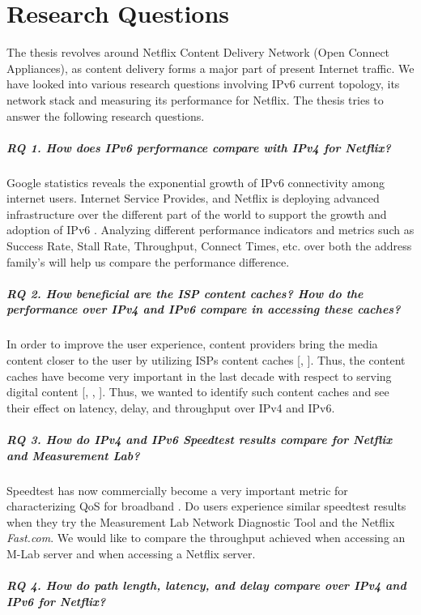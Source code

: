 \FloatBarrier

\section{Research Questions}
The thesis revolves around Netflix Content Delivery Network (Open Connect Appliances), as content delivery forms a major part of present Internet traffic. 
We have looked into various research questions involving IPv6 current topology, its network stack and measuring its performance for Netflix. 
The thesis tries to answer the following research questions.

\subparagraph{RQ 1. How does IPv6 performance compare with IPv4 for Netflix?}


Google statistics \cite{gv6} reveals the exponential growth of IPv6 connectivity among internet users. Internet Service Provides, and Netflix is deploying advanced infrastructure over the different part of the world to support the growth and adoption of IPv6 \cite{netflixipv6}. 
Analyzing different performance indicators and metrics such as Success Rate, Stall Rate, Throughput, Connect Times, etc. over both the address family's will help us compare the performance difference. 

\subparagraph{RQ 2. How beneficial are the ISP content caches? How do the performance over IPv4 and IPv6 compare in accessing these caches?}


In order to improve the user experience, content providers bring the media content closer to the user by utilizing ISPs content caches [\cite{cc1}, \cite{cc2}]. Thus, the content caches have become
very important in the last decade with respect to serving digital content [\cite{cc3}, \cite{cc4}, \cite{cc5}]. Thus, we wanted to identify such content caches and see their effect on latency, delay, and throughput over IPv4 and IPv6.

\subparagraph{RQ 3. How do IPv4 and IPv6 Speedtest results compare for Netflix and Measurement Lab?}


Speedtest has now commercially become a very important metric for characterizing QoS for broadband \cite{speedtest}. Do users experience similar speedtest results when they try the 
Measurement Lab Network Diagnostic Tool \cite{mlabtool} and the Netflix \textit{Fast.com}. We would like to compare the throughput achieved when accessing an M-Lab server and when accessing a Netflix server.

\subparagraph{RQ 4. How do path length, latency, and delay compare over IPv4 and IPv6 for Netflix?}


